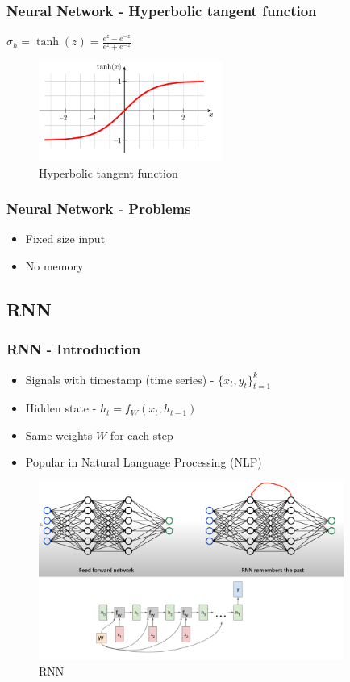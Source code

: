 \documentclass[12pt]{report}
\begin{document}
\subsubsection{Neural Network - Hyperbolic tangent  function}
$\sigma_h = \tanh(z) = \frac{e^z-e^{-z}}{e^z+e^{-z}}$
\begin{figure}[H]\centering\includegraphics[width=6cm]{tanh.png}\caption{Hyperbolic tangent function}\end{figure}


\subsubsection{Neural Network - Problems}


\begin{itemize}
	\item Fixed size input
	\item No memory
\end{itemize}


\newpage
\subsection{RNN}

\subsubsection{RNN - Introduction}
\begin{itemize}
	\item Signals with timestamp (time series) - $\{x_t, y_t \}_{t=1}^k$
	\item Hidden state - $h_t = f_{W}(x_t, h_{t-1})$
	\item Same weights $W$ for each step
	\item Popular in Natural Language Processing (NLP)
\end{itemize}
\begin{figure}[H]\centering\includegraphics[width=10cm]{RNN.png}\caption{RNN}\end{figure}
\end{document}
